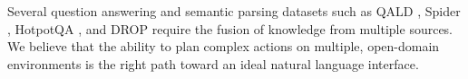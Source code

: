 Several question answering and semantic parsing datasets
such as QALD \cite{lopez2013evaluating},
Spider \cite{yu2018spider},
HotpotQA \cite{yang2018hotpotqa},
and DROP \cite{dua2019drop}
require the fusion of knowledge from multiple sources.
We believe that the ability to plan complex actions
on multiple, open-domain environments is the right path
toward an ideal natural language interface.
